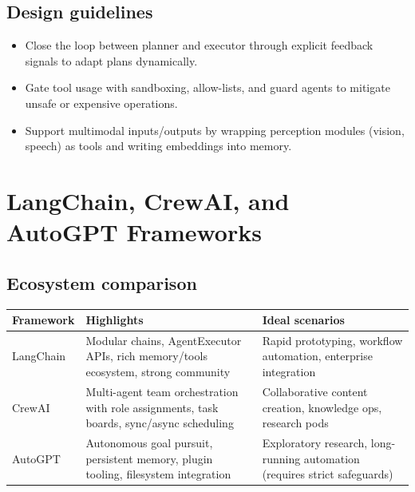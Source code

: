\documentclass{article}
\begin{document}
\subsection{Design guidelines}
\begin{itemize}
  \item Close the loop between planner and executor through explicit feedback signals to adapt plans dynamically.
  \item Gate tool usage with sandboxing, allow-lists, and guard agents to mitigate unsafe or expensive operations.
  \item Support multimodal inputs/outputs by wrapping perception modules (vision, speech) as tools and writing embeddings into memory.
\end{itemize}

\section{LangChain, CrewAI, and AutoGPT Frameworks}
\subsection{Ecosystem comparison}
\begin{longtable}{p{3.2cm}p{4.5cm}p{6cm}}
\toprule
Framework & Highlights & Ideal scenarios \\
\midrule
LangChain & Modular chains, AgentExecutor APIs, rich memory/tools ecosystem, strong community & Rapid prototyping, workflow automation, enterprise integration \\
CrewAI & Multi-agent team orchestration with role assignments, task boards, sync/async scheduling & Collaborative content creation, knowledge ops, research pods \\
AutoGPT & Autonomous goal pursuit, persistent memory, plugin tooling, filesystem integration & Exploratory research, long-running automation (requires strict safeguards) \\
\bottomrule
\end{longtable}
\end{document}
